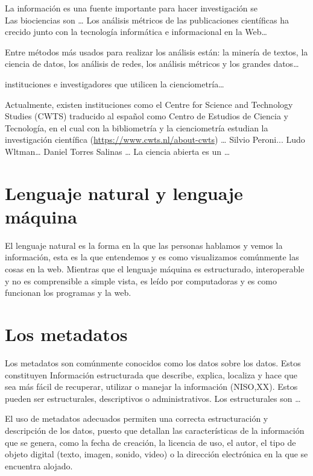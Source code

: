 \documentclass[../Main.tex]{subfiles}
\begin{document}
\noindent
La información es una fuente importante para hacer investigación se \parencite{hull_defrosting_2008}\\ 
Las biociencias son …
\smallskip
Los análisis métricos de las publicaciones científicas ha crecido junto con la tecnología informática e informacional en la Web…

\smallskip
Entre métodos más usados para realizar los análisis están: la minería de textos, la ciencia de datos, los análisis de redes, los análisis métricos y los grandes datos…

\smallskip
instituciones e investigadores que utilicen la cienciometría… 

\smallskip
Actualmente, existen instituciones como el Centre for Science and Technology Studies (CWTS) traducido al español como Centro de Estudios de Ciencia y Tecnología, en el cual con la bibliometría y la cienciometría estudian la investigación científica (\url{https://www.cwts.nl/about-cwts}) …
\smallskip
Silvio Peroni... 
Ludo Wltman… 
Daniel Torres Salinas … 
La ciencia abierta es un …
\section{Lenguaje natural y lenguaje máquina}
\noindent
El lenguaje natural es la forma en la que las personas hablamos y vemos la información, esta es la que entendemos y es como visualizamos comúnmente las cosas en la web. Mientras que el lenguaje máquina es estructurado, interoperable y no es comprensible a simple vista, es leído por computadoras y es como funcionan los programas y la web. 

\section{Los metadatos}
\noindent
Los metadatos son comúnmente conocidos como los datos sobre los datos. Estos constituyen Información estructurada que describe, explica, localiza y hace que sea más fácil de recuperar, utilizar o manejar la información (NISO,XX). Estos pueden ser estructurales, descriptivos o administrativos. Los estructurales son …\parencite{gartner_metadata_2016}\parencite{pomerantz_metadata_2015}


\smallskip
El uso de metadatos adecuados permiten una correcta estructuración y descripción de los datos, puesto que detallan las características de la información que se genera, como la fecha de creación, la licencia de uso, el autor, el tipo de objeto digital (texto, imagen, sonido, video) o la dirección electrónica en la que se encuentra alojado.
\end{document}

